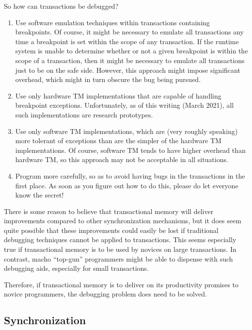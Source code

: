 So how can transactions be debugged?

\begin{enumerate}
\item	Use software emulation techniques within transactions containing
	breakpoints.
	Of course, it might be necessary to emulate all transactions
	any time a breakpoint is set within the scope of any transaction.
	If the runtime system is unable to determine whether or not a
	given breakpoint is within the scope of a transaction, then it
	might be necessary to emulate all transactions just to be on
	the safe side.
	However, this approach might impose significant overhead, which
	might in turn obscure the bug being pursued.
\item	Use only hardware TM implementations that are capable of
	handling breakpoint exceptions.
	Unfortunately, as of this writing (March 2021), all such
	implementations are research prototypes.
\item	Use only software TM implementations, which are
	(very roughly speaking) more tolerant of exceptions than are
	the simpler of the hardware TM implementations.
	Of course, software TM tends to have higher overhead than hardware
	TM, so this approach may not be acceptable in all situations.
\item	Program more carefully, so as to avoid having bugs in the
	transactions in the first place.
	As soon as you figure out how to do this, please do let everyone
	know the secret!
\end{enumerate}

There is some reason to believe that transactional memory will deliver
 improvements compared to other synchronization mechanisms,
but it does seem quite possible that these improvements could easily
be lost if traditional debugging techniques cannot be applied to
transactions.
This seems especially true if transactional memory is to be used by
novices on large transactions.
In contrast, macho ``top-gun'' programmers might be able to dispense with
such debugging aids, especially for small transactions.

Therefore, if transactional memory is to deliver on its productivity
promises to novice programmers, the debugging problem does need to
be solved.

\subsection{Synchronization}
\label{sec:future:Synchronization}

